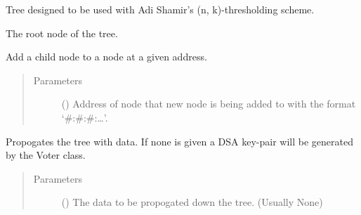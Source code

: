 \documentclass[letterpaper,10pt,english]{sphinxmanual}
\begin{document}
\begin{fulllineitems}
\label{\detokenize{index:ThresTree.ThresTree}}
Tree designed to be used with Adi Shamir’s (n, k)-thresholding scheme.

\begin{fulllineitems}
\label{\detokenize{index:ThresTree.ThresTree.root}}
 \textendash{} The root node of the tree.

\end{fulllineitems}


\begin{fulllineitems}
\label{\detokenize{index:ThresTree.ThresTree.addChild}}
Add a child node to a node at a given address.
\begin{quote}\begin{description}
\item[{Parameters}] \leavevmode
{} () \textendash{} Address of node that new node is being added to with the format ‘\#:\#:\#:…’.

\end{description}\end{quote}

\end{fulllineitems}


\begin{fulllineitems}
\label{\detokenize{index:ThresTree.ThresTree.propagate}}
Propogates the tree with data. If none is given a DSA key-pair will be generated by the Voter class.
\begin{quote}\begin{description}
\item[{Parameters}] \leavevmode
{} () \textendash{} The data to be propogated down the tree. (Usually None)

\end{description}\end{quote}


\end{fulllineitems}
\end{fulllineitems}
\end{document}
